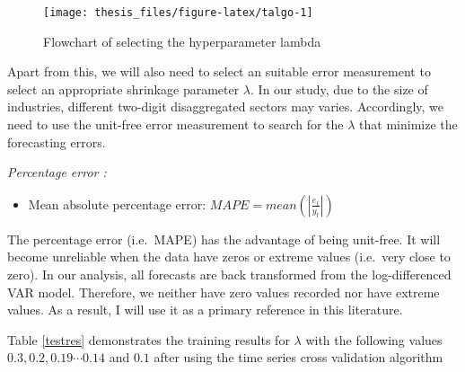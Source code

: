 \documentclass{monashthesis}
\begin{document}
\begin{figure}

{\centering \texttt{[image: thesis\_files/figure-latex/talgo-1]} 

}

\caption{Flowchart of selecting the hyperparameter lambda}\label{fig:talgo}
\end{figure}

Apart from this, we will also need to select an suitable error measurement to select an appropriate shrinkage parameter \(\lambda\). In our study, due to the size of industries, different two-digit disaggregated sectors may varies. Accordingly, we need to use the unit-free error measurement to search for the \(\lambda\) that minimize the forecasting errors.

\emph{Percentage error :}

\begin{itemize}
\tightlist
\item
  Mean absolute percentage error: \(MAPE = mean(|\frac{e_t}{y_t}|)\)
\end{itemize}

The percentage error (i.e.~MAPE) has the advantage of being unit-free. It will become unreliable when the data have zeros or extreme values (i.e.~very close to zero). In our analysis, all forecasts are back transformed from the log-differenced VAR model. Therefore, we neither have zero values recorded nor have extreme values. As a result, I will use it as a primary reference in this literature.

\vspace{24pt}

Table \ref{testres} demonstrates the training results for \(\lambda\) with the following values \(0.3,0.2,0.19 \cdots 0.14\) and \(0.1\) after using the time series cross validation algorithm
\end{document}
